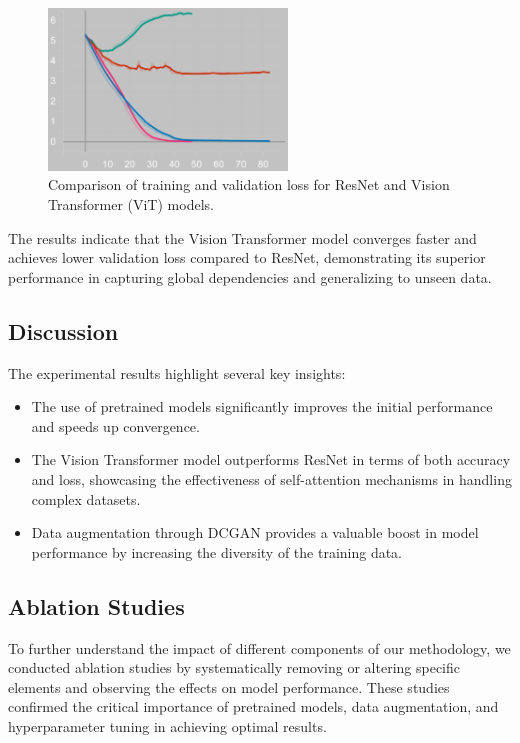 \begin{figure}[h]
    \centering
    \includegraphics[width=240]{res/data_loss.png}
    \caption{Comparison of training and validation loss for ResNet and Vision Transformer (ViT) models.}
    \label{fig:loss_comparison}
\end{figure}

The results indicate that the Vision Transformer model converges faster and achieves lower validation loss compared to ResNet, demonstrating its superior performance in capturing global dependencies and generalizing to unseen data.

\subsection{Discussion}
The experimental results highlight several key insights:
\begin{itemize}
    \item The use of pretrained models significantly improves the initial performance and speeds up convergence.
    \item The Vision Transformer model outperforms ResNet in terms of both accuracy and loss, showcasing the effectiveness of self-attention mechanisms in handling complex datasets.
    \item Data augmentation through DCGAN provides a valuable boost in model performance by increasing the diversity of the training data.
\end{itemize}

\subsection{Ablation Studies}
To further understand the impact of different components of our methodology, we conducted ablation studies by systematically removing or altering specific elements and observing the effects on model performance. These studies confirmed the critical importance of pretrained models, data augmentation, and hyperparameter tuning in achieving optimal results.

